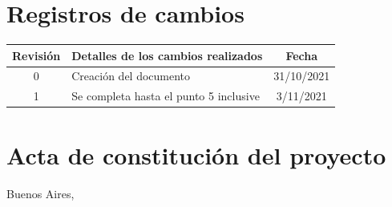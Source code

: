 \documentclass[
11pt, %
]{charter}
\begin{document}
\maketitle
\thispagestyle{empty}
\pagebreak


\thispagestyle{empty}
{\setlength{\parskip}{0pt}
\tableofcontents{}
}
\pagebreak


\section*{Registros de cambios}
\label{sec:registro}


\begin{table}[ht]
\label{tab:registro}
\centering
\begin{tabularx}{\linewidth}{@{}|c|X|c|@{}}
\hline
\rowcolor[HTML]{C0C0C0} 
Revisión & \multicolumn{1}{c|}{\cellcolor[HTML]{C0C0C0}Detalles de los cambios realizados} & Fecha      \\ \hline
0      & Creación del documento                                 & 31/10/2021 \\ \hline
1      & Se completa hasta el punto 5 inclusive                 & 3/11/2021 \\ \hline
\end{tabularx}
\end{table}

\pagebreak



\section*{Acta de constitución del proyecto}
\label{sec:acta}

\begin{flushright}
Buenos Aires, \fechaInicioName
\end{flushright}

\vspace{2cm}
\end{document}
